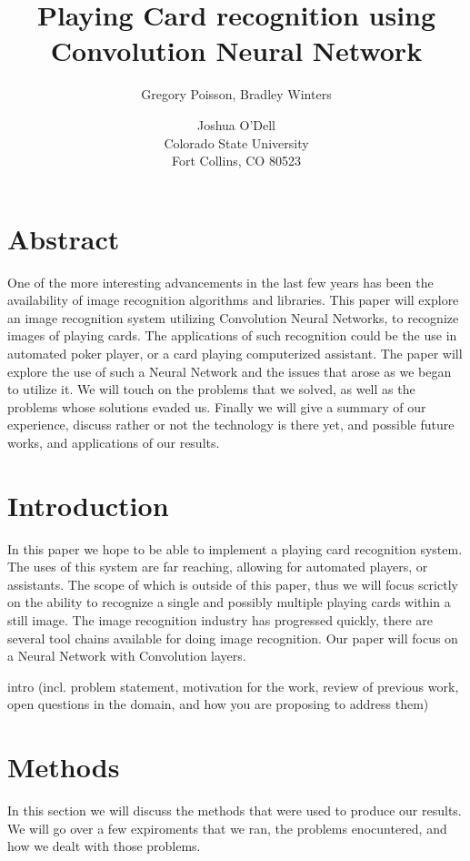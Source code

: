 \documentclass[letterpaper]{article}
\title{Playing Card recognition using Convolution Neural Network}
\author{Gregory Poisson, Bradley Winters \and Joshua O'Dell \\ Colorado State University \\ Fort Collins, CO 80523 }
\begin{document}
\maketitle

\section{Abstract}

One of the more interesting advancements in the last few years has been the availability of image recognition algorithms and libraries.  This paper will explore an image recognition system utilizing Convolution Neural Networks, to recognize images of playing cards.  The applications of such recognition could be the use in automated poker player, or a card playing computerized assistant.  The paper will explore the use of such a Neural Network and the issues that arose as we began to utilize it.  We will touch on the problems that we solved, as well as the problems whose solutions evaded us.  Finally we will give a summary of our experience, discuss rather or not the technology is there yet, and possible future works, and applications of our results.

\section{Introduction}

In this paper we hope to be able to implement a playing card recognition system.  The uses of this system are far reaching, allowing for automated players, or assistants.  The scope of which is outside of this paper, thus we will focus scrictly on the ability to recognize a single and possibly multiple playing cards within a still image.
The image recognition industry has progressed quickly, there are several tool chains available for doing image recognition.  Our paper will focus on a Neural Network with Convolution layers.

intro (incl. problem statement, motivation for the work, review of previous work, open questions in the domain, and how you are proposing to address them)

\section{Methods}
In this section we will discuss the methods that were used to produce our results.  We will go over a few expiroments that we ran, the problems enocuntered, and how we dealt with those problems.
\end{document}
